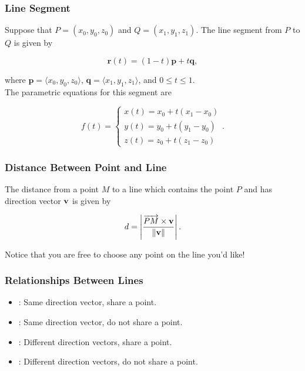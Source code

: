 \subsubsection{Line Segment}

Suppose that \(P = (x_{0},y_{0},z_{0})\) and \(Q = (x_{1},y_{1},z_{1})\). The line segment from \(P\) to \(Q\) is given by

\[
    \mathbf{r}(t) = (1 - t)\mathbf{p} + t\mathbf{q},
\]

where \(\mathbf{p} = \langle x_{0},y_{0},z_{0} \rangle\), \(\mathbf{q} = \langle x_{1},y_{1},z_{1} \rangle\), and \(0 \leq t \leq 1\). \\

The parametric equations for this segment are 

\[
    f(t) = \begin{cases}
        x(t) = x_{0} + t(x_{1} - x_{0}) \\
        y(t) = y_{0} + t(y_{1} - y_{0}) \\
        z(t) = z_{0} + t(z_{1} - z_{0})
    \end{cases}.
\]

\subsubsection{Distance Between Point and Line}

The distance from a point \(M\) to a line which contains the point \(P\) and has direction vector \(\mathbf{v}\) is given by

\[
    d = \left| \frac{\overrightarrow{PM} \times \mathbf{v}}{\left\lVert \mathbf{v}\right\rVert} \right|.
\]

Notice that you are free to choose any point on the line you'd like!

\subsubsection{Relationships Between Lines}

\begin{itemize}
    \item {}: Same direction vector, share a point.
    \item {}: Same direction vector, do not share a point.
    \item {}: Different direction vectors, share a point.
    \item {}: Different direction vectors, do not share a point.
\end{itemize}

